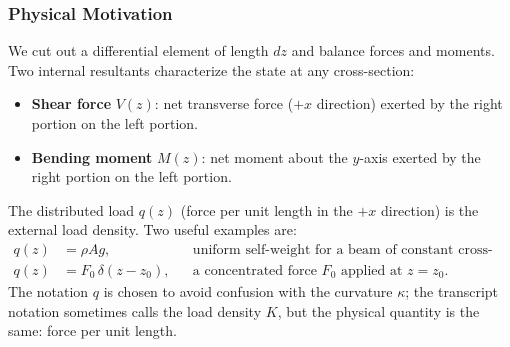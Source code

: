 \documentclass[../main.tex]{subfiles}
\begin{document}
\subsubsection*{Physical Motivation}
We cut out a differential element of length $dz$ and balance forces and moments. Two internal resultants characterize the state at any cross-section:
\begin{itemize}
  \item \textbf{Shear force} $V(z)$: net transverse force ($+x$ direction) exerted by the right portion on the left portion.
  \item \textbf{Bending moment} $M(z)$: net moment about the $y$-axis exerted by the right portion on the left portion.
\end{itemize}
The distributed load $q(z)$ (force per unit length in the $+x$ direction) is the external load density. Two useful examples are:
\begin{align}
  q(z) &= \rho A g,
  &&\text{uniform self-weight for a beam of constant cross-section,}
  \label{eq:lec09_uniform_load}\\
  q(z) &= F_0\,\delta(z-z_0),
  &&\text{a concentrated force $F_0$ applied at $z=z_0$.}
  \label{eq:lec09_point_load}
\end{align}
The notation $q$ is chosen to avoid confusion with the curvature $\kappa$; the transcript notation sometimes calls the load density $K$, but the physical quantity is the same: force per unit length.
\end{document}
